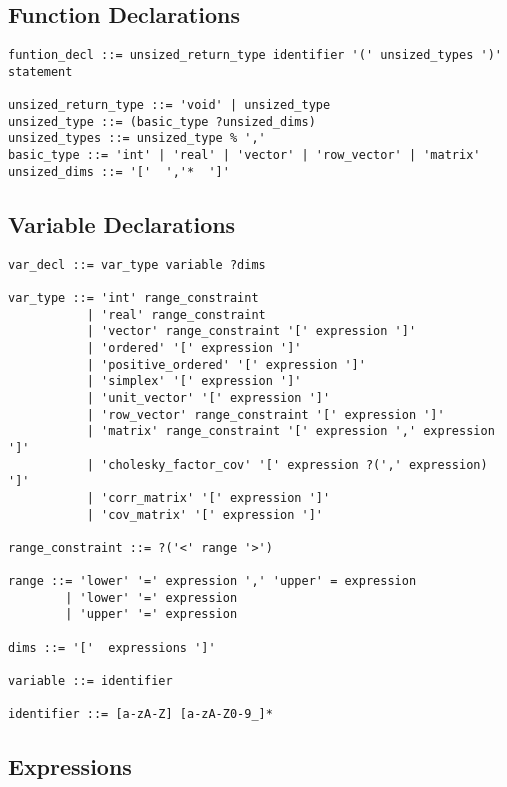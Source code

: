 \subsection{Function Declarations}

{
\small
\begin{Verbatim}[fontsize=\small]
funtion_decl ::= unsized_return_type identifier '(' unsized_types ')' statement

unsized_return_type ::= 'void' | unsized_type
unsized_type ::= (basic_type ?unsized_dims)
unsized_types ::= unsized_type % ','
basic_type ::= 'int' | 'real' | 'vector' | 'row_vector' | 'matrix'
unsized_dims ::= '['  ','*  ']'
\end{Verbatim}
}

\subsection{Variable Declarations}

{
\small
\begin{Verbatim}[fontsize=\small]
var_decl ::= var_type variable ?dims

var_type ::= 'int' range_constraint
           | 'real' range_constraint
           | 'vector' range_constraint '[' expression ']'
           | 'ordered' '[' expression ']'
           | 'positive_ordered' '[' expression ']'
           | 'simplex' '[' expression ']'
           | 'unit_vector' '[' expression ']'
           | 'row_vector' range_constraint '[' expression ']'
           | 'matrix' range_constraint '[' expression ',' expression ']'
           | 'cholesky_factor_cov' '[' expression ?(',' expression) ']'
           | 'corr_matrix' '[' expression ']'
           | 'cov_matrix' '[' expression ']'

range_constraint ::= ?('<' range '>')

range ::= 'lower' '=' expression ',' 'upper' = expression
        | 'lower' '=' expression
        | 'upper' '=' expression

dims ::= '['  expressions ']'

variable ::= identifier

identifier ::= [a-zA-Z] [a-zA-Z0-9_]*
\end{Verbatim}
}

\subsection{Expressions}

